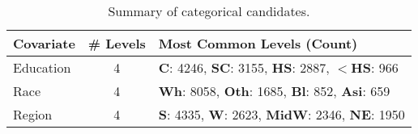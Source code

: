 \begin{table}[h!]
\centering
\begin{tabular}{|l|c|p{8cm}|}
\hline
\rowcolor[HTML]{E7EAF6} 
\textbf{Covariate} & \textbf{\# Levels} & \textbf{Most Common Levels (Count)} \\ \hline
Education & 4 & \textbf{C}: 4246, \textbf{SC}: 3155, \textbf{HS}: 2887, \textbf{$<$HS}: 966 \\ \hline
Race & 4 & \textbf{Wh}: 8058, \textbf{Oth}: 1685, \textbf{Bl}: 852, \textbf{Asi}: 659 \\ \hline
Region & 4 & \textbf{S}: 4335, \textbf{W}: 2623, \textbf{MidW}: 2346, \textbf{NE}: 1950 \\ \hline
\end{tabular}
\caption{Summary of categorical candidates.}
\end{table}
